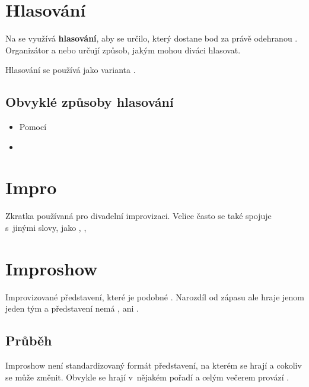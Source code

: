  
\needspace{5cm} \section{Hlasování} \label{hlasování} Na  se využívá \textbf{hlasování}, aby se určilo, který  dostane bod za právě odehranou . Organizátor a nebo  určují způsob, jakým mohou diváci hlasovat. 
 
Hlasování se používá jako varianta . 
 
\subsection{ Obvyklé způsoby hlasování } \begin{itemize}
\item  Pomocí 
\item  {}
\end{itemize}
 
 
\needspace{5cm} \section{Impro} \label{impro} Zkratka používaná pro divadelní improvizaci. Velice často se také spojuje s~jinými slovy, jako , ,  
 
 
\needspace{5cm} \section{Improshow} \label{improshow} Improvizované představení, které je podobné . Narozdíl od zápasu ale hraje jenom jeden tým a představení nemá , ani . 
 
\subsection{ Průběh } Improshow není standardizovaný formát představení, na kterém se hrají  a cokoliv se může změnit. Obvykle se hrají  v~nějakém pořadí a celým večerem provází . 
 
 
 
